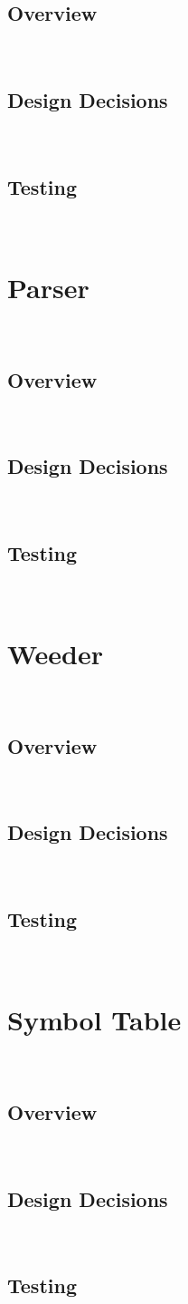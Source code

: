 \documentclass[11pt]{article}
\begin{document}
\subsection{Overview}~%
\subsection{Design Decisions}~%
\subsection{Testing}~%
\section{Parser}~%
\subsection{Overview}~%
\subsection{Design Decisions}~%
\subsection{Testing}~%
\section{Weeder}~%
\subsection{Overview}~%
\subsection{Design Decisions}~%
\subsection{Testing}~%
\section{Symbol Table}~%
\subsection{Overview}~%
\subsection{Design Decisions}~%
\subsection{Testing}~%
\end{document}

